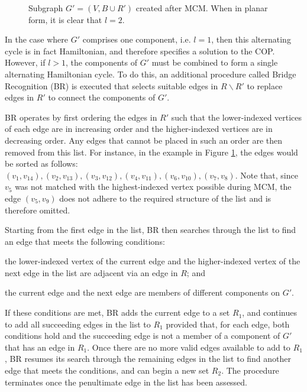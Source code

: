 \documentclass[runningheads]{llncs}
\begin{document}
\begin{figure}[H]	
	\centering
	\begin{subfigure}[h]{0.4\textwidth}
		
	\end{subfigure} \quad
	\begin{subfigure}[h]{0.56\textwidth}
		
	\end{subfigure}
	\caption{Subgraph $G'= (V, B \cup R')$ created after MCM. When in planar form, it is clear that $l = 2$.}
	\label{fig:mps}
\end{figure}

\noindent In the case where $G'$ comprises one component, i.e. $l = 1$, then this alternating cycle is in fact Hamiltonian, and therefore specifies a solution to the COP. However, if $l > 1$, the components of $G'$ must be combined to form a single alternating Hamiltonian cycle. To do this, an additional procedure called Bridge Recognition (BR) is executed that selects suitable edges in $R\backslash R'$ to replace edges in $R'$ to connect the components of $G'$.

BR operates by first ordering the edges in $R'$ such that the lower-indexed vertices of each edge are in increasing order and the higher-indexed vertices are in decreasing order. Any edges that cannot be placed in such an order are then removed from this list. For instance, in the example in Figure \ref{fig:mps}, the edges would be sorted as follows: $(v_1, v_{14}), (v_2, v_{13}),(v_3, v_{12}),(v_4, v_{11}),(v_6, v_{10}),(v_7, v_8)$. Note that, since $v_5$ was not matched with the highest-indexed vertex possible during MCM, the edge $(v_5, v_9)$ does not adhere to the required structure of the list and is therefore omitted.

Starting from the first edge in the list, BR then searches through the list to find an edge that meets the following conditions: 
\begin{enumerate*}[label={(\alph*)}]
	\item the lower-indexed vertex of the current edge and the higher-indexed vertex of the next edge in the list are adjacent via an edge in $R$; and
	\item the current edge and the next edge are members of different components on $G'$.
\end{enumerate*}
If these conditions are met, BR adds the current edge to a set $R_1$, and continues to add all succeeding edges in the list to $R_1$ provided that, for each edge, both conditions hold and the succeeding edge is not a member of a component of $G'$ that has an edge in $R_1$. Once there are no more valid edges available to add to $R_1$, BR resumes its search through the remaining edges in the list to find another edge that meets the conditions, and can begin a new set $R_2$. The procedure terminates once the penultimate edge in the list has been assessed.
\end{document}
